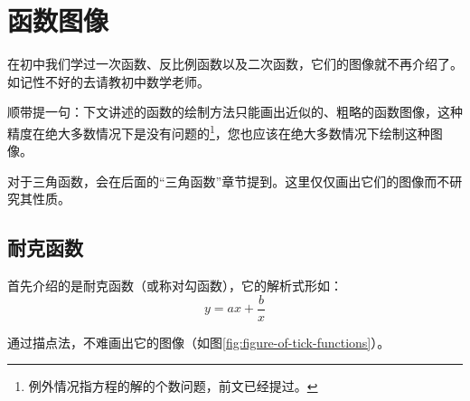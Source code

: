 \section{函数图像}
在初中我们学过一次函数、反比例函数以及二次函数，它们的图像就不再介绍了。如记性不好的去请教初中数学老师。

顺带提一句：下文讲述的函数的绘制方法只能画出近似的、粗略的函数图像，这种精度在绝大多数情况下是没有问题的\footnote{例外情况指方程的解的个数问题，前文已经提过。}，您也应该在绝大多数情况下绘制这种图像。

对于三角函数，会在后面的“三角函数”章节提到。这里仅仅画出它们的图像而不研究其性质。

\subsection{耐克函数}
首先介绍的是耐克函数（或称对勾函数），它的解析式形如：\[y=ax+\frac{b}{x}\]

通过描点法，不难画出它的图像（如图\ref{fig:figure-of-tick-functions}）。

